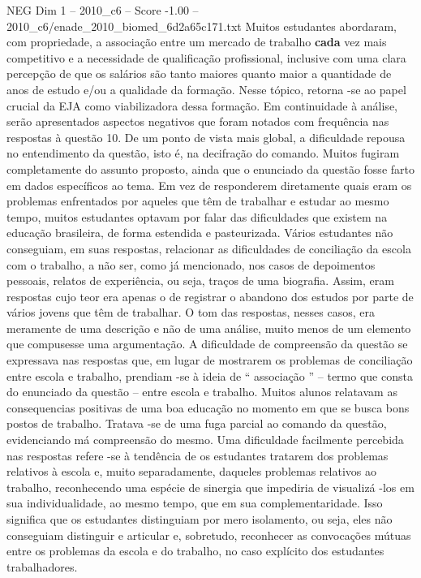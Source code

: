 \begin{textsample}{NEG Dim 1 – 2010\_c6 – Score -1.00 – 2010\_c6/enade\_2010\_biomed\_6d2a65c171.txt}
Muitos estudantes abordaram, com propriedade, a associação entre um mercado de trabalho \textbf{cada} vez mais competitivo e a necessidade de qualificação profissional, inclusive com uma clara percepção de que os salários são tanto maiores quanto maior a quantidade de anos de estudo e/ou a qualidade da formação.
Nesse tópico, retorna -se ao papel crucial da EJA como viabilizadora dessa formação.
Em continuidade à análise, serão apresentados aspectos negativos que foram notados com frequência nas respostas à questão 10.
De um ponto de vista mais global, a dificuldade repousa no entendimento da questão, isto é, na decifração do comando.
Muitos fugiram completamente do assunto proposto, ainda que o enunciado da questão fosse farto em dados específicos ao tema.
Em vez de responderem diretamente quais eram os problemas enfrentados por aqueles que têm de trabalhar e estudar ao mesmo tempo, muitos estudantes optavam por falar das dificuldades que existem na educação brasileira, de forma estendida e pasteurizada.
Vários estudantes não conseguiam, em suas respostas, relacionar as dificuldades de conciliação da escola com o trabalho, a não ser, como já mencionado, nos casos de depoimentos pessoais, relatos de experiência, ou seja, traços de uma biografia.
Assim, eram respostas cujo teor era apenas o de registrar o abandono dos estudos por parte de vários jovens que têm de trabalhar.
O tom das respostas, nesses casos, era meramente de uma descrição e não de uma análise, muito menos de um elemento que compusesse uma argumentação.
A dificuldade de compreensão da questão se expressava nas respostas que, em lugar de mostrarem os problemas de conciliação entre escola e trabalho, prendiam -se à ideia de “ associação ” – termo que consta do enunciado da questão – entre escola e trabalho.
Muitos alunos relatavam as consequencias positivas de uma boa educação no momento em que se busca bons postos de trabalho.
Tratava -se de uma fuga parcial ao comando da questão, evidenciando má compreensão do mesmo.
Uma dificuldade facilmente percebida nas respostas refere -se à tendência de os estudantes tratarem dos problemas relativos à escola e, muito separadamente, daqueles problemas relativos ao trabalho, reconhecendo uma espécie de sinergia que impediria de visualizá -los em sua individualidade, ao mesmo tempo, que em sua complementaridade.
Isso significa que os estudantes distinguiam por mero isolamento, ou seja, eles não conseguiam distinguir e articular e, sobretudo, reconhecer as convocações mútuas entre os problemas da escola e do trabalho, no caso explícito dos estudantes trabalhadores.

\end{textsample}
